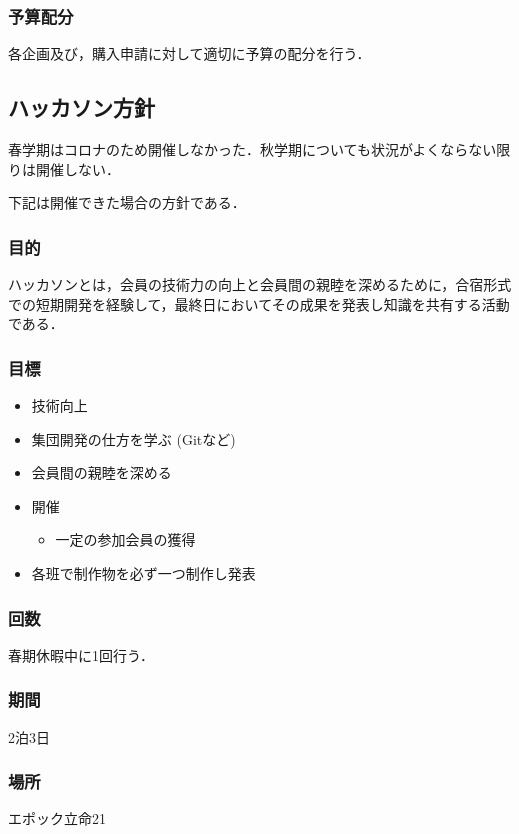 \subsubsection*{予算配分}
各企画及び，購入申請に対して適切に予算の配分を行う．


\subsection*{ハッカソン方針}
春学期はコロナのため開催しなかった．秋学期についても状況がよくならない限りは開催しない．

下記は開催できた場合の方針である．

\subsubsection*{目的}
ハッカソンとは，会員の技術力の向上と会員間の親睦を深めるために，合宿形式での短期開発を経験して，最終日においてその成果を発表し知識を共有する活動である．

\subsubsection*{目標}
\begin{itemize}
    \item 技術向上
    \item 集団開発の仕方を学ぶ (Gitなど)
    \item 会員間の親睦を深める
    \item 開催
    \begin{itemize}
        \item 一定の参加会員の獲得
    \end{itemize}
    \item 各班で制作物を必ず一つ制作し発表
\end{itemize}


\subsubsection*{回数}
春期休暇中に1回行う．

\subsubsection*{期間}
2泊3日

\subsubsection*{場所}
エポック立命21

